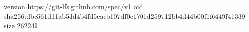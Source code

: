 version https://git-lfs.github.com/spec/v1
oid sha256:dbc561d11ab5dd4b4fd5eaeb107df0c1701d259712bb4d44b00f1f6449f41339
size 262240
